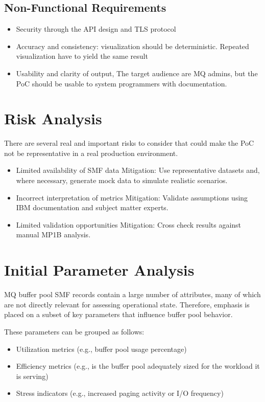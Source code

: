 \subsection{Non-Functional Requirements}
\begin{itemize}
    \item Security through the API design and TLS protocol
    \item Accuracy and consistency: visualization should be deterministic. Repeated visualization have to yield the same result
    \item Usability and clarity of output, The target audience are MQ admins, but the PoC should be usable to system programmers with documentation. 
\end{itemize}

\section{Risk Analysis}

There are several real and important risks to consider that could make the PoC not be representative in a real production environment.

\begin{itemize}
    \item Limited availability of SMF data  
    Mitigation: Use representative datasets and, where necessary, generate mock data to simulate realistic scenarios.
    
    \item Incorrect interpretation of metrics  
    Mitigation: Validate assumptions using IBM documentation and subject matter experts.
    
    \item Limited validation opportunities  
    Mitigation: Cross check results against manual MP1B analysis.
\end{itemize}

\section{Initial Parameter Analysis}

MQ buffer pool SMF records contain a large number of attributes, many of which are not directly relevant for assessing operational state. Therefore, emphasis is placed on a subset of key parameters that influence buffer pool behavior.

These parameters can be grouped as follows:

\begin{itemize}
    \item Utilization metrics (e.g., buffer pool usage percentage)
    \item Efficiency metrics (e.g., is the buffer pool adequately sized for the workload it is serving) %
    \item Stress indicators (e.g., increased paging activity or I/O frequency)
\end{itemize}

